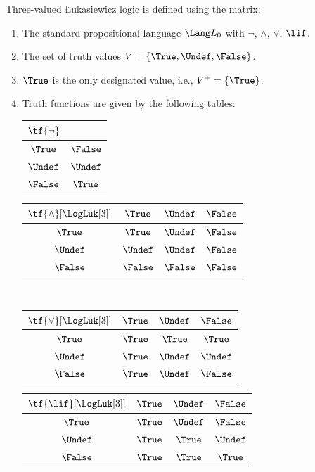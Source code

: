 \documentclass[../../../../include/open-logic-chapter]{subfiles}
\begin{document}
\begin{defn}
Three-valued \L ukasiewicz logic is defined using the matrix:
\begin{enumerate}
  \item The standard propositional language $\Lang L_0$ with
  $\lnot$, $\land$, $\lor$, $\lif$.
  \item The set of truth values $V = \{\True, \Undef, \False\}$.
  \item $\True$ is the only designated value, i.e., $V^+ = \{\True\}$.
  \item Truth functions are given by the following tables:
  \begin{center}
    \begin{tabular}{c|c} 
      $\tf{\lnot}$ & \\ 
      \hline  
      $\True$ & $\False$ \\ 
      $\Undef$ & $\Undef$ \\
      $\False$ & $\True$ 
    \end{tabular}
    \quad
    \begin{tabular}{c|ccc} 
      $\tf{\land}[\LogLuk[3]]$ & $\True$ & $\Undef$ & $\False$ \\ 
      \hline 
      $\True$ & $\True$ & $\Undef$ & $\False$ \\ 
      $\Undef$ & $\Undef$ & $\Undef$ & $\False$\\ 
      $\False$ & $\False$ & $\False$ & $\False$ 
    \end{tabular}
    \\[2ex]
    \begin{tabular}{c|ccc} 
      $\tf{\lor}[\LogLuk[3]]$ & $\True$ & $\Undef$ & $\False$ \\ 
      \hline 
      $\True$ & $\True$ & $\True$ & $\True$ \\ 
      $\Undef$ & $\True$ & $\Undef$ & $\Undef$ \\
      $\False$ & $\True$ & $\Undef$ & $\False$ 
    \end{tabular}
    \quad
    \begin{tabular}{c|ccc} 
      $\tf{\lif}[\LogLuk[3]]$ & $\True$ & $\Undef$ & $\False$ \\ 
      \hline 
      $\True$ & $\True$ & $\Undef$ & $\False$ \\ 
      $\Undef$ & $\True$ & $\True$ & $\Undef$  \\ 
      $\False$ & $\True$ & $\True$ & $\True$ 
    \end{tabular}
  \end{center} 
\end{enumerate}
\end{defn}
\end{document}
